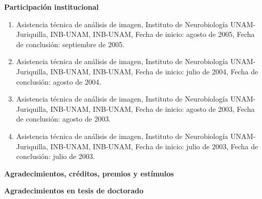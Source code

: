 \documentclass[12pt]{article}
\begin{document}
\textbf{Participación institucional}

\begin{enumerate}
\item Asistencia técnica de análisis de imagen, Instituto de Neurobiología UNAM-Juriquilla, INB-UNAM, INB-UNAM, Fecha de inicio: agosto 
de 
2005, Fecha de conclusión: septiembre de 2005.

\item Asistencia técnica de análisis de imagen, Instituto de Neurobiología UNAM-Juriquilla, INB-UNAM, INB-UNAM, Fecha de inicio: julio 
de 
2004, Fecha de conclusión: agosto de 2004.

\item Asistencia técnica de análisis de imagen, Instituto de Neurobiología UNAM-Juriquilla, INB-UNAM, INB-UNAM, Fecha de inicio: agosto 
de 
2003, Fecha de conclusión: agosto de 2003.

\item Asistencia técnica de análisis de imagen, Instituto de Neurobiología UNAM-Juriquilla, INB-UNAM, INB-UNAM, Fecha de inicio: julio 
de 
2003, Fecha de conclusión: julio de 2003.
\end{enumerate}

\textbf{Agradecimientos, créditos, premios y estímulos}

\hfill

\textbf{Agradecimientos en tesis de doctorado}
\end{document}
